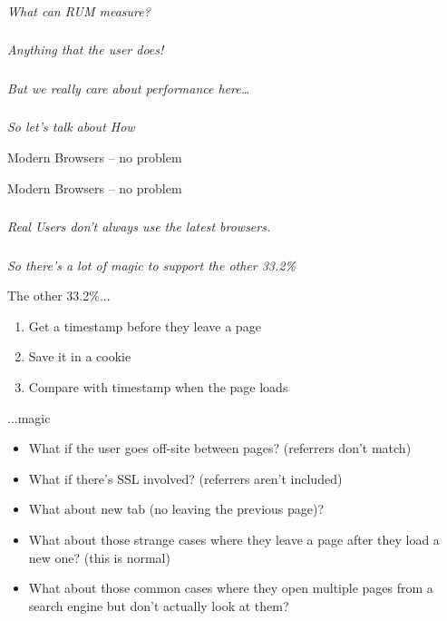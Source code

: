 \documentclass{beamer}
\newcommand{\innersplash}[1]{
  \begin{center}
    \Large \textrm{\textit{ #1 } }
  \end{center}
}
\newcommand{\splashslide}[2][{}]{
  \begin{frame}
  \frametitle{#1}
  \innersplash{#2}
  \end{frame}
}
\begin{document}
\splashslide{What can RUM measure?}

\splashslide{Anything that the user does! \\ \only<2->{(in the browser)}}

\splashslide{But we really care about performance here\ldots}

\splashslide{So let's talk about How}

\begin{frame}{Modern Browsers -- no problem}
\end{frame}

\begin{frame}{Modern Browsers -- no problem}
\end{frame}

\splashslide{Real Users don't always use the latest browsers.}

\splashslide{So there's a lot of magic to support the other 33.2\%}

\begin{frame}{The other 33.2\%...}
  \begin{enumerate}
  \item Get a timestamp before they leave a page
  \item Save it in a cookie
  \item Compare with timestamp when the page loads
  \end{enumerate}
\end{frame}

\begin{frame}{...magic}
  \begin{itemize}
    \item What if the user goes off-site between pages? (referrers don't match)
    \item What if there's SSL involved? (referrers aren't included)
    \item What about new tab (no leaving the previous page)?
    \item What about those strange cases where they leave a page after they load a new one? (this is normal)
    \item What about those common cases where they open multiple pages from a search engine but don't actually look at them?
  \end{itemize}
\end{frame}
\end{document}
